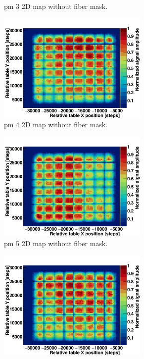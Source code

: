 \begin{figure}
\begin{subfigure}[t]{.5\textwidth}
\caption{\gls{pm} 3 2D map without fiber mask.}
\label{chap3::fig::hodoPMchar2DnoMask_pm3}
\end{subfigure}
\begin{subfigure}[t]{.5\textwidth}
\centering
\includegraphics[width=0.8\textwidth]{03_GraphicFiles/chapter3_CLaRySproto/Hodoscope/PMchar/Maps_noMask/2DMap_PM4_Norm.png}
\caption{\gls{pm} 4 2D map without fiber mask.}
\label{chap3::fig::hodoPMchar2DnoMask_pm4}
\end{subfigure}
\begin{subfigure}[t]{.5\textwidth}
\centering
\includegraphics[width=0.8\textwidth]{03_GraphicFiles/chapter3_CLaRySproto/Hodoscope/PMchar/Maps_noMask/2DMap_PM5_Norm.png}
\caption{\gls{pm} 5 2D map without fiber mask.}
\label{chap3::fig::hodoPMchar2DnoMask_pm5}
\end{subfigure}
\begin{subfigure}[t]{.5\textwidth}
\centering
\includegraphics[width=0.8\textwidth]{03_GraphicFiles/chapter3_CLaRySproto/Hodoscope/PMchar/Maps_noMask/2DMap_PM6_Norm.png}

\end{subfigure}
\end{figure}
